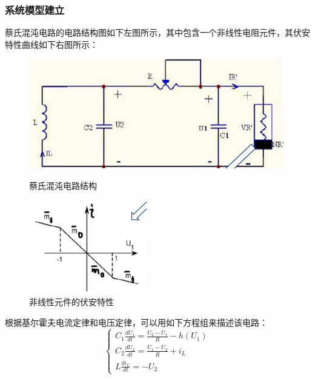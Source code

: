 \documentclass[UTF8]{article}
\begin{document}
\subsubsection{系统模型建立}
蔡氏混沌电路的电路结构图如下左图所示，其中包含一个非线性电阻元件，其伏安特性曲线如下右图所示：
\begin{figure}[htbp]
	\centering
	\begin{minipage}{0.49\linewidth}
		\centering
		\includegraphics[width=1\linewidth]{figure/混沌电路结构.png}
		\caption{蔡氏混沌电路结构}
		\label{label1} %
	\end{minipage}
	\begin{minipage}{0.49\linewidth}
		\centering
		\includegraphics[width=0.6\linewidth]{figure/非线性元件伏安特性曲线.png}
		\caption{非线性元件的伏安特性}
		\label{label2} %
	\end{minipage}
\end{figure}

根据基尔霍夫电流定律和电压定律，可以用如下方程组来描述该电路：
\begin{equation*}
	\begin{cases}
		C_1\frac{dU_1}{dt} = 
		\frac{U_2 - U_1}{R} - h(U_1) \\
		C_2\frac{dU_2}{dt} = \frac{U_1 - U_2}{R} + i_L \\
		L\frac{di_L}{dt} = -U_2
	\end{cases}
\end{equation*}
\end{document}
